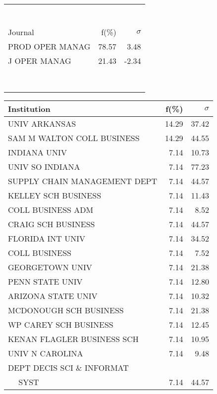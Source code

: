 \documentclass[a4paper,11pt]{report}
\begin{document}
\begin{landscape}
\begin{table}[!ht]
{\begin{tabular}{|l r  r|}
 &  & \\
 &  & \\
 &  & \\
 &  & \\
 &  & \\
 &  & \\
 &  & \\
\hline
\hline
Journal & f(\%) & $\sigma$\\
\hline
PROD OPER MANAG & 78.57 & 3.48\\
J OPER MANAG & 21.43 & -2.34\\
 &  & \\
 &  & \\
 &  & \\
 &  & \\
 &  & \\
 &  & \\
 &  & \\
 &  & \\
\hline
\end{tabular}
}
{\scriptsize\begin{tabular}{|l r r|}
\hline
Institution & f(\%) & $\sigma$\\
\hline
UNIV ARKANSAS & 14.29 & 37.42\\
SAM M WALTON COLL BUSINESS & 14.29 & 44.55\\
INDIANA UNIV & 7.14 & 10.73\\
UNIV SO INDIANA & 7.14 & 77.23\\
SUPPLY CHAIN MANAGEMENT DEPT & 7.14 & 44.57\\
KELLEY SCH BUSINESS & 7.14 & 11.43\\
COLL BUSINESS ADM & 7.14 & 8.52\\
CRAIG SCH BUSINESS & 7.14 & 44.57\\
FLORIDA INT UNIV & 7.14 & 34.52\\
COLL BUSINESS & 7.14 & 7.52\\
GEORGETOWN UNIV & 7.14 & 21.38\\
PENN STATE UNIV & 7.14 & 12.80\\
ARIZONA STATE UNIV & 7.14 & 10.32\\
MCDONOUGH SCH BUSINESS & 7.14 & 21.38\\
WP CAREY SCH BUSINESS & 7.14 & 12.45\\
KENAN FLAGLER BUSINESS SCH & 7.14 & 10.95\\
UNIV N CAROLINA & 7.14 & 9.48\\
DEPT DECIS SCI \& INFORMAT &  & \\
$\quad$ SYST & 7.14 & 44.57\\

\end{tabular}}
\end{table}
\end{landscape}
\end{document}
